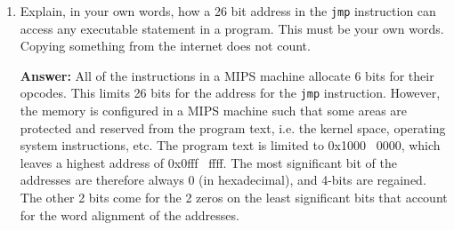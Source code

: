 \documentclass[12pt]{article}
\begin{document}
\begin{enumerate}
\begin{enumerate}
    \end{enumerate}

    \item Explain, in your own words, how a 26 bit address in the \texttt{jmp} instruction can access any executable statement in a program. This must be your own words. Copying something from the internet does not count.

    \textbf{Answer:} All of the instructions in a MIPS machine allocate 6 bits for their opcodes. This limits 26 bits for the address for the \texttt{jmp} instruction. However, the memory is configured in a MIPS machine such that some areas are protected and reserved from the program text, i.e. the kernel space, operating system instructions, etc. The program text is limited to 0x1000 \ 0000, which leaves a highest address of 0x0fff \ ffff. The most significant bit of the addresses are therefore always 0 (in hexadecimal), and 4-bits are regained. The other 2 bits come for the 2 zeros on the least significant bits that account for the word alignment of the addresses.

  \end{enumerate}
\end{document}
